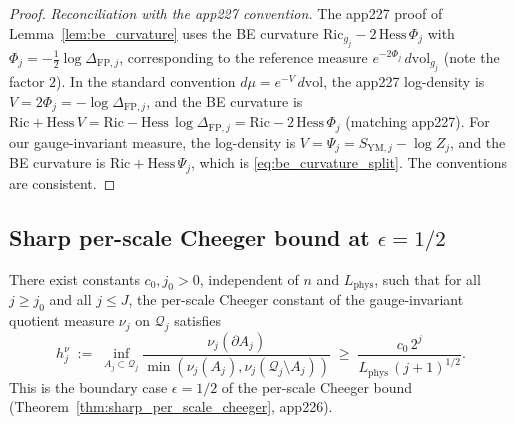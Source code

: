 \begin{proof}
\emph{Reconciliation with the app227 convention.} The app227
proof of Lemma~\ref{lem:be_curvature} uses the BE curvature
$\mathrm{Ric}_{g_{j}}-2\,\mathrm{Hess}\,\Phi_{j}$ with
$\Phi_{j}=-\tfrac{1}{2}\log\Delta_{\mathrm{FP},j}$, corresponding
to the reference measure
$e^{-2\Phi_{j}}\,d\mathrm{vol}_{g_{j}}$ (note the factor $2$).
In the standard convention $d\mu=e^{-V}\,d\mathrm{vol}$, the
app227 log-density is $V=2\Phi_{j}=-\log\Delta_{\mathrm{FP},j}$,
and the BE curvature is $\mathrm{Ric}+\mathrm{Hess}\,V=
\mathrm{Ric}-\mathrm{Hess}\,\log\Delta_{\mathrm{FP},j}=
\mathrm{Ric}-2\,\mathrm{Hess}\,\Phi_{j}$ (matching app227).
For our gauge-invariant measure, the log-density is
$V=\Psi_{j}=S_{\mathrm{YM},j}-\log Z_{j}$, and the BE curvature
is $\mathrm{Ric}+\mathrm{Hess}\,\Psi_{j}$, which is
\eqref{eq:be_curvature_split}. The conventions are consistent.
\end{proof}

\subsection{Sharp per-scale Cheeger bound at $\epsilon=1/2$}
\label{ssec:app229_sharp_cheeger}

\begin{theorem}
\label{thm:sharp_cheeger_gauge_invariant}
There exist constants $c_{0},j_{0}>0$, independent of $n$ and
$L_{\mathrm{phys}}$, such that for all $j\ge j_{0}$ and all
$j\le J$, the per-scale Cheeger constant of the gauge-invariant
quotient measure $\nu_{j}$ on $\mathcal{Q}_{j}$ satisfies
\begin{equation}
\label{eq:sharp_cheeger_gauge_invariant}
  h_{j}^{\nu}
  \;:=\;\inf_{A_{j}\subset\mathcal{Q}_{j}}
  \frac{\nu_{j}(\partial A_{j})}{\min(\nu_{j}(A_{j}),
  \nu_{j}(\mathcal{Q}_{j}\setminus A_{j}))}
  \;\ge\;\frac{c_{0}\,2^{j}}{L_{\mathrm{phys}}\,
  (j+1)^{1/2}}.
\end{equation}
This is the boundary case $\epsilon=1/2$ of the per-scale Cheeger
bound (Theorem~\ref{thm:sharp_per_scale_cheeger}, app226).
\end{theorem}

